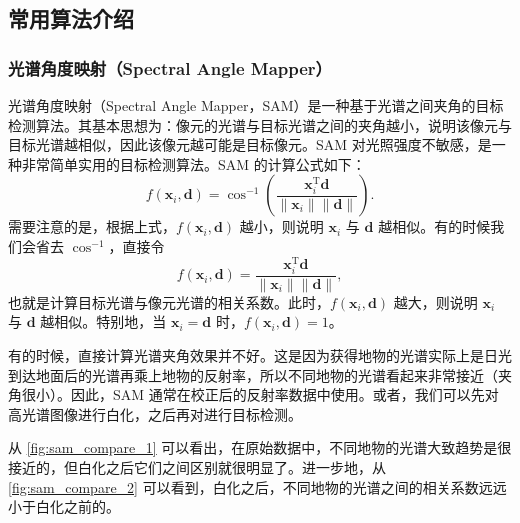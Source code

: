 \subsection{常用算法介绍}

\subsubsection{光谱角度映射（Spectral Angle Mapper）}
光谱角度映射（Spectral Angle Mapper，SAM）是一种基于光谱之间夹角的目标检测算法。其基本思想为：像元的光谱与目标光谱之间的夹角越小，说明该像元与目标光谱越相似，因此该像元越可能是目标像元。SAM 对光照强度不敏感，是一种非常简单实用的目标检测算法。SAM 的计算公式如下：
\[
    f(\bm{x}_{i}, \bm{d}) = \cos^{-1}\left(\frac{\bm{x}_{i}^{\mathrm{T}}\bm{d}}{\|\bm{x}_{i}\|\|\bm{d}\|}\right).
\]
需要注意的是，根据上式，\(f(\bm{x}_{i}, \bm{d})\) 越小，则说明 \(\bm{x}_{i}\) 与 \(\bm{d}\) 越相似。有的时候我们会省去 \(\cos^{-1}\)，直接令
\[
    f(\bm{x}_{i}, \bm{d}) = \frac{\bm{x}_{i}^{\mathrm{T}}\bm{d}}{\|\bm{x}_{i}\|\|\bm{d}\|},
\]
也就是计算目标光谱与像元光谱的相关系数。此时，\(f(\bm{x}_{i}, \bm{d})\) 越大，则说明 \(\bm{x}_{i}\) 与 \(\bm{d}\) 越相似。特别地，当 \(\bm{x}_{i} = \bm{d}\) 时，\(f(\bm{x}_{i}, \bm{d}) = 1\)。

有的时候，直接计算光谱夹角效果并不好。这是因为获得地物的光谱实际上是日光到达地面后的光谱再乘上地物的反射率，所以不同地物的光谱看起来非常接近（夹角很小）。因此，SAM 通常在校正后的反射率数据中使用。或者，我们可以先对高光谱图像进行白化，之后再对进行目标检测。

从 \cref{fig:sam_compare_1} 可以看出，在原始数据中，不同地物的光谱大致趋势是很接近的，但白化之后它们之间区别就很明显了。进一步地，从 \cref{fig:sam_compare_2} 可以看到，白化之后，不同地物的光谱之间的相关系数远远小于白化之前的。

